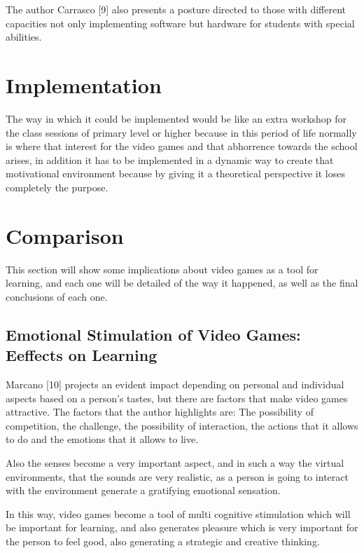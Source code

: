 \documentclass[conference, letterpaper]{IEEEtran}
\begin{document}
The author Carrasco [9] also presents a posture directed to those with different capacities not only implementing software but hardware for students with special abilities. 

\section{Implementation}
The way in which it could be implemented would be like an extra workshop for the class sessions of primary level or higher because in this period of life normally is where that interest for the video games and that abhorrence towards the school arises, in addition it has to be implemented in a dynamic way to create that motivational environment because by giving it a theoretical perspective it loses completely the purpose.

\section{Comparison}
This section will show some implications about video games as a tool for learning, and each one will be detailed of the way it happened, as well as the final conclusions of each one.


\subsection{Emotional Stimulation of Video Games: Eeffects on Learning} 
Marcano [10] projects an evident impact depending on personal and individual aspects based on a person's tastes, but there are factors that make video games attractive. The factors that the author highlights are: The possibility of competition, the challenge, the possibility of interaction, the actions that it allows to do and the emotions that it allows to live.
  
Also the senses become a very important aspect, and in such a way the virtual environments, that the sounds are very realistic, as a person is going to interact with the environment generate a gratifying emotional sensation.

In this way, video games become a tool of multi cognitive stimulation which will be important for learning, and also generates pleasure which is very important for the person to feel good, also generating a strategic and creative thinking.
\end{document}
